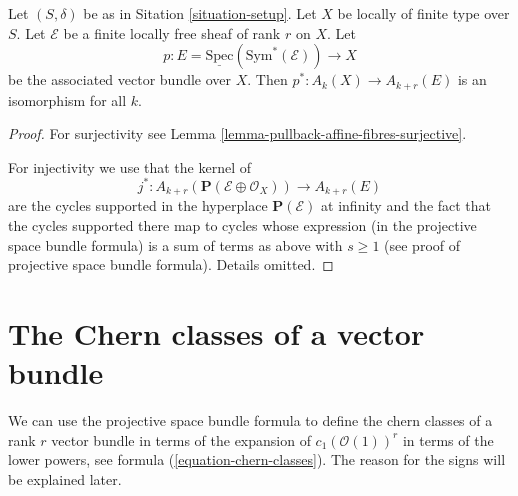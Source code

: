 \begin{lemma}
\label{lemma-vectorbundle}
Let $(S, \delta)$ be as in Sitation \ref{situation-setup}.
Let $X$ be locally of finite type over $S$.
Let $\mathcal{E}$ be a finite locally free sheaf of rank $r$ on $X$.
Let
$$
p :
E = \underline{\text{Spec}}(\text{Sym}^*(\mathcal{E}))
\longrightarrow
X
$$
be the associated vector bundle over $X$.
Then $p^* : A_k(X) \to A_{k + r}(E)$ is an isomorphism for all $k$.
\end{lemma}

\begin{proof}
For surjectivity see Lemma \ref{lemma-pullback-affine-fibres-surjective}.

\medskip\noindent
For injectivity we use that the kernel of
$$
j^* :
A_{k + r}(\mathbf{P}(\mathcal{E} \oplus \mathcal{O}_X))
\longrightarrow
A_{k + r}(E)
$$
are the cycles supported in the hyperplace $\mathbf{P}(\mathcal{E})$
at infinity and the fact that the cycles supported there map to cycles
whose expression (in the projective space bundle formula) is a sum of
terms as above with $s \geq 1$ (see proof of projective space bundle
formula). Details omitted.
\end{proof}








\section{The Chern classes of a vector bundle}
\label{section-chern-classes-vector-bundles}

\noindent
We can use the projective space bundle formula to define the
chern classes of a rank $r$ vector bundle in terms of the expansion
of $c_1(\mathcal{O}(1))^r$ in terms of the lower powers, see
formula (\ref{equation-chern-classes}).
The reason for the signs will be explained later.


